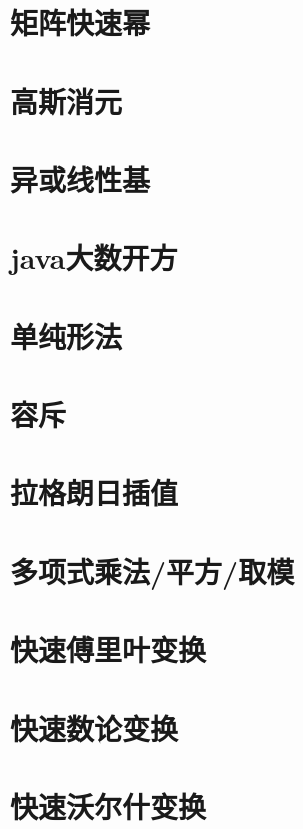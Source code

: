 \section{矩阵快速幂}
\raggedbottom
\hrulefill
\section{高斯消元}
\raggedbottom
\hrulefill
\section{异或线性基}
\raggedbottom
\hrulefill
\section{java大数开方}
\raggedbottom
\hrulefill
\section{单纯形法}
\raggedbottom
\hrulefill
\section{容斥}
\raggedbottom
\hrulefill
\section{拉格朗日插值}
\raggedbottom
\hrulefill
\section{多项式乘法/平方/取模}
\raggedbottom
\hrulefill
\section{快速傅里叶变换}
\raggedbottom
\hrulefill
\section{快速数论变换}
\raggedbottom
\hrulefill
\section{快速沃尔什变换}
\raggedbottom
\hrulefill
